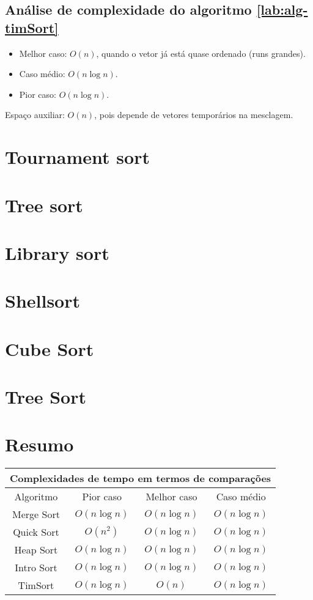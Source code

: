 \subsection{Análise de complexidade do algoritmo \ref{lab:alg-timSort}}
\begin{itemize}
    \item Melhor caso: $O(n)$, quando o vetor já está quase ordenado (runs grandes).
    \item Caso médio: $O(n \log n)$.
    \item Pior caso: $O(n \log n)$.
\end{itemize}
Espaço auxiliar: $O(n)$, pois depende de vetores temporários na mesclagem.

\section{Tournament sort}

\section{Tree sort}

\section{Library sort}

\section{Shellsort}

\section{Cube Sort}

\section{Tree Sort}




\section{Resumo}

\begin{center}
\begin{tabular}{||c|c|c|c||}
\hline
\multicolumn{4}{|c|}{Complexidades de tempo em termos de comparações} \\\hline
Algoritmo & Pior caso & Melhor caso & Caso médio\\
\hline
Merge Sort & $O(n\log n)$ & $O(n\log n)$ & $O(n\log n)$ \\
Quick Sort & $O(n^2)$    & $O(n\log n)$ & $O(n\log n)$ \\
Heap Sort  & $O(n\log n)$ & $O(n\log n)$ & $O(n\log n)$ \\
Intro Sort & $O(n\log n)$ & $O(n\log n)$ & $O(n\log n)$ \\
TimSort    & $O(n\log n)$ & $O(n)$       & $O(n\log n)$ \\\hline
\end{tabular}
\end{center}

